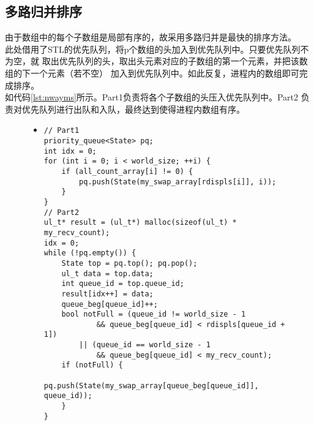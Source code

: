 \documentclass[a4paper]{article}
\begin{document}
\subsection{多路归并排序}
由于数组中的每个子数组是局部有序的，故采用多路归并是最快的排序方法。\\

此处借用了STL的优先队列，将p个数组的头加入到优先队列中。只要优先队列不为空，就
取出优先队列的头，取出头元素对应的子数组的第一个元素，并把该数组的下一个元素（若不空）
加入到优先队列中。如此反复，进程内的数组即可完成排序。 \\

如代码\autoref{lst:nwayms}所示。Part1负责将各个子数组的头压入优先队列中。Part2
负责对优先队列进行出队和入队，最终达到使得进程内数组有序。
\begin{figure}[!hbt]
\begin{itemize}
\item[] \begin{lstlisting}[style=mycpp, label=lst:nwayms, caption=多路归并排序]
// Part1
priority_queue<State> pq;
int idx = 0;
for (int i = 0; i < world_size; ++i) {
    if (all_count_array[i] != 0) {
        pq.push(State(my_swap_array[rdispls[i]], i));
    }
}
// Part2
ul_t* result = (ul_t*) malloc(sizeof(ul_t) * my_recv_count);
idx = 0;
while (!pq.empty()) {
    State top = pq.top(); pq.pop();
    ul_t data = top.data;
    int queue_id = top.queue_id;
    result[idx++] = data;
    queue_beg[queue_id]++;
    bool notFull = (queue_id != world_size - 1 
            && queue_beg[queue_id] < rdispls[queue_id + 1])
        || (queue_id == world_size - 1 
            && queue_beg[queue_id] < my_recv_count);
    if (notFull) {
        pq.push(State(my_swap_array[queue_beg[queue_id]], queue_id));
    }
}

\end{lstlisting}
\end{itemize}
\end{figure}


\end{document}
